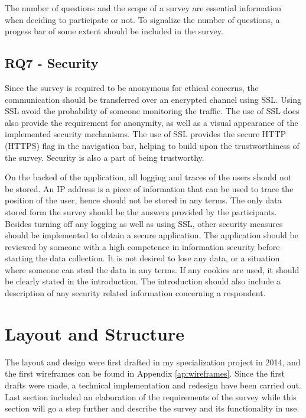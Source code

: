     The number of questions and the scope of a survey are essential information when deciding to participate or not. To signalize the number of questions, a progess bar of some extent should be included in the survey.

    \subsection*{RQ7 - Security}
    Since the survey is required to be anonymous for ethical concerns, the communication should be transferred over an encrypted channel using SSL. Using SSL avoid the probability of someone monitoring the traffic. The use of SSL does also provide the requirement for anonymity, as well as a visual appearance of the implemented security mechanisms. The use of SSL provides the secure HTTP (HTTPS) flag in the navigation bar, helping to build upon the trustworthiness of the survey. Security is also a part of being trustworthy. 

    On the backed of the application, all logging and traces of the users should not be stored. An IP address is a piece of information that can be used to trace the position of the user, hence should not be stored in any terms. The only data stored form the survey should be the answers provided by the participants. Besides turning off any logging as well as using SSL, other security measures should be implemented to obtain a secure application. The application should be reviewed by someone with a high competence in information security before starting the data collection. It is not desired to lose any data, or a situation where someone can steal the data in any terms. If any cookies are used, it should be clearly stated in the introduction. The introduction should also include a description of any security related information concerning a respondent.

	\section{Layout and Structure}\label{sec:layoutandstructure}
  The layout and design were first drafted in my specialization project in 2014, and the first wireframes can be found in Appendix \ref{ap:wireframes}. Since the first drafts were made, a technical implementation and redesign have been carried out. Last section included an elaboration of the requirements of the survey while this section will go a step further and describe the survey and its functionality in use. 

